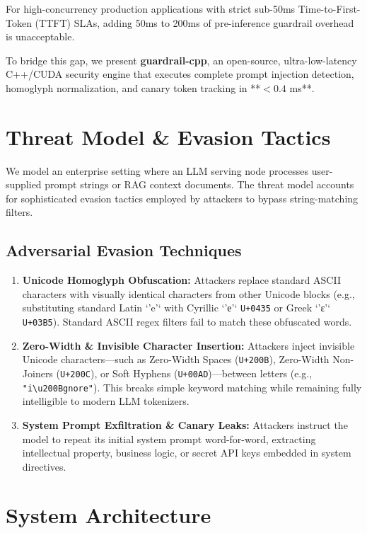 \documentclass[11pt,a4paper]{article}
\begin{document}
For high-concurrency production applications with strict sub-50ms Time-to-First-Token (TTFT) SLAs, adding 50ms to 200ms of pre-inference guardrail overhead is unacceptable. 

To bridge this gap, we present \textbf{guardrail-cpp}, an open-source, ultra-low-latency C++/CUDA security engine that executes complete prompt injection detection, homoglyph normalization, and canary token tracking in **$<0.4$ ms**.

\section{Threat Model \& Evasion Tactics}

We model an enterprise setting where an LLM serving node processes user-supplied prompt strings or RAG context documents. The threat model accounts for sophisticated evasion tactics employed by attackers to bypass string-matching filters.

\subsection{Adversarial Evasion Techniques}
\begin{enumerate}
    \item \textbf{Unicode Homoglyph Obfuscation:} Attackers replace standard ASCII characters with visually identical characters from other Unicode blocks (e.g., substituting standard Latin `'e'` with Cyrillic `'е'` \texttt{U+0435} or Greek `'ε'` \texttt{U+03B5}). Standard ASCII regex filters fail to match these obfuscated words.
    \item \textbf{Zero-Width & Invisible Character Insertion:} Attackers inject invisible Unicode characters—such as Zero-Width Spaces (\texttt{U+200B}), Zero-Width Non-Joiners (\texttt{U+200C}), or Soft Hyphens (\texttt{U+00AD})—between letters (e.g., \texttt{"i\textbackslash u200Bgnore"}). This breaks simple keyword matching while remaining fully intelligible to modern LLM tokenizers.
    \item \textbf{System Prompt Exfiltration & Canary Leaks:} Attackers instruct the model to repeat its initial system prompt word-for-word, extracting intellectual property, business logic, or secret API keys embedded in system directives.
\end{enumerate}

\section{System Architecture}
\end{document}
